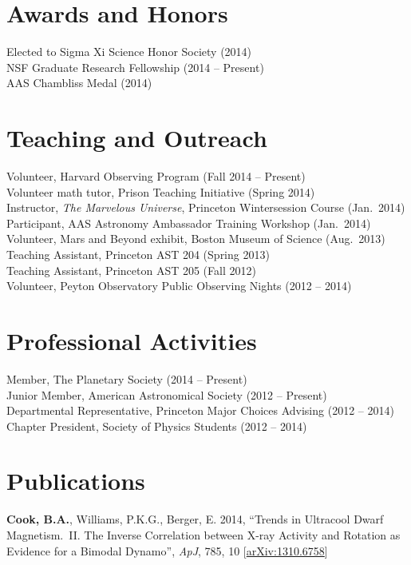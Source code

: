 \documentclass{res}
\begin{document}
\begin{resume}
\section{\textbf{Awards and Honors}}
\vspace{.1in}
Elected to Sigma Xi Science Honor Society (2014)\\
NSF Graduate Research Fellowship (2014 -- Present)\\
AAS Chambliss Medal (2014)


\section{\textbf{Teaching and Outreach}} 
\vspace{.1in}     
Volunteer, Harvard Observing Program (Fall 2014 -- Present)\\
Volunteer math tutor, Prison Teaching Initiative (Spring 2014)\\
Instructor, \textit{The Marvelous Universe}, Princeton Wintersession Course (Jan.~2014)\\
Participant, AAS Astronomy Ambassador Training Workshop (Jan.~2014)\\
Volunteer, Mars and Beyond exhibit, Boston Museum of Science (Aug.~2013)\\
Teaching Assistant, Princeton AST 204 (Spring 2013)\\
Teaching Assistant, Princeton AST 205 (Fall 2012)\\
Volunteer, Peyton Observatory Public Observing Nights (2012
-- 2014)

\section{\textbf{Professional Activities}}
\vspace{0.1in}
Member, The Planetary Society (2014 -- Present)\\
Junior Member, American Astronomical Society (2012 -- Present)\\
Departmental Representative, Princeton Major Choices Advising (2012 -- 2014)\\
Chapter President, Society of Physics Students (2012 -- 2014)


\section{\textbf{Publications}}
\vspace{.1in} \textbf{Cook, B.A.}, Williams, P.K.G., Berger, E. 2014,
``Trends in Ultracool Dwarf Magnetism.~II. The Inverse Correlation
between X-ray Activity and Rotation as Evidence for a Bimodal
Dynamo'', \textit{ApJ}, 785, 10
[\href{http://arxiv.org/abs/1310.6758}{arXiv:1310.6758}]


\end{resume}
\end{document}
